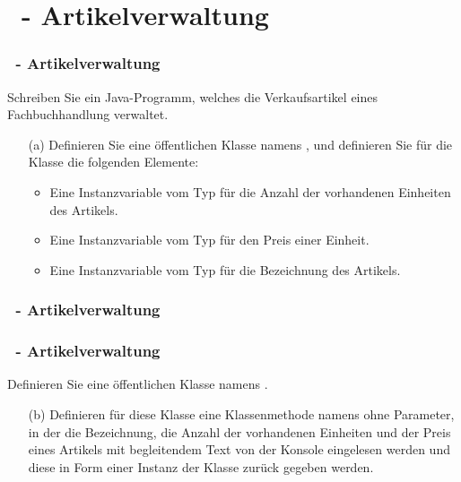 \def\stitle{\theexercise\ - Artikelverwaltung}
\section{\stitle}
\begin{frame}%
  \frametitle{\stitle}%
Schreiben Sie ein Java-Programm, welches die Verkaufsartikel eines Fachbuchhandlung verwaltet.

\begin{enumerate}
\item[(a)] Definieren Sie eine \"offentlichen Klasse namens , und definieren Sie für die Klasse die folgenden Elemente:
  \begin{itemize}
    \item Eine Instanzvariable  vom Typ  für die Anzahl der vorhandenen Einheiten des Artikels.
    \item Eine Instanzvariable  vom Typ  für den Preis einer Einheit.
    \item Eine Instanzvariable  vom Typ  für die Bezeichnung des Artikels.
  \end{itemize}
\end{enumerate}
\end{frame}


\begin{frame}%
  \frametitle{\stitle}%

\end{frame}


\begin{frame}%
  \frametitle{\stitle}%
Definieren Sie eine \"offentlichen Klasse namens .
\begin{enumerate}
\item[(b)]
  Definieren für diese Klasse eine Klassenmethode namens  ohne Parameter, in der die Bezeichnung, die Anzahl der vorhandenen Einheiten und der Preis eines Artikels mit begleitendem Text von der Konsole eingelesen werden und diese in Form einer Instanz der Klasse  zur\"uck gegeben werden.
\end{enumerate}
\pause

\end{frame}



